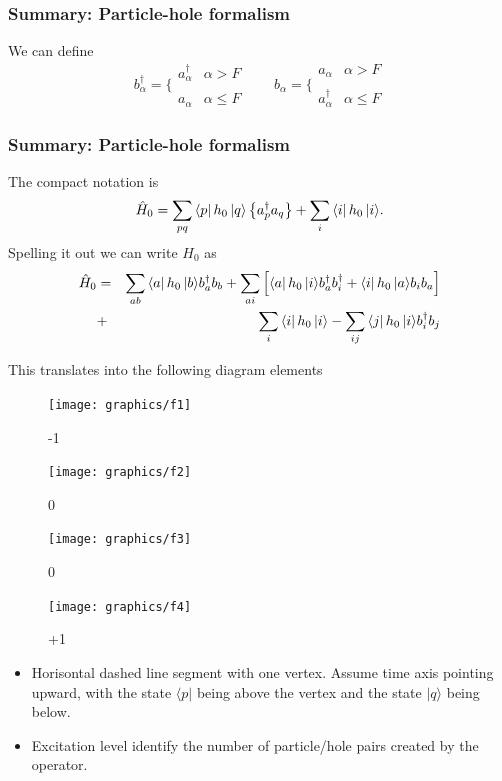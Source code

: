 \frame
{
  \frametitle{Summary: Particle-hole formalism}
\begin{small}
{\scriptsize
We can define
\[
	b_\alpha^\dagger = \Bigg\{ \begin{array}{ll}
		a_\alpha^\dagger & \alpha > F \\
		\\
		a_\alpha & \alpha \leq F
	\end{array} \qquad 
	b_\alpha = \Bigg\{ \begin{array}{ll}
		a_\alpha & \alpha > F \\
		\\
		 a_\alpha^\dagger & \alpha \leq F
	\end{array} 
\]
}
\end{small}
}


\frame
{
  \frametitle{Summary: Particle-hole formalism}
\begin{small}
{\scriptsize
The compact notation is 
\[
        \hat{H}_0 = \sum_{pq} \bra{p}h_0\,|{q}\rangle \left\{a^\dagger_p a_q\right\} +\sum_{i} \bra{i}h_0\,|{i}\rangle.
\]
Spelling it out we can write $H_0$ as 
\begin{eqnarray}
	\hat{H}_0 &=& \sum_{ab} \bra{a}h_0\,|{b}\rangle  b_a^\dagger b_b +
		\sum_{ai} \left[
		\bra{a}h_0\,|{i}\rangle b_a^\dagger b_i^\dagger + 
		\bra{i}h_0\,|{a}\rangle b_i  b_a \right] \nonumber \\
	&+& \sum_{i} \bra{i}h_0\,|{i}\rangle - 
		\sum_{ij} \bra{j}h_0\,|{i}\rangle
		b_i^\dagger b_j \nonumber
\end{eqnarray}
}
\end{small}
}

\begin{frame}{This translates into the following diagram elements}
    \renewcommand{\figurename}{Level}
    \begin{figure}
    \centering
    \parbox{0.20\textwidth}{
            \centering
            \texttt{[image: graphics/f1]}
            \caption{-1}
        }
        \parbox{0.20\textwidth}{
            \centering
            \texttt{[image: graphics/f2]}
            \caption{0}
        }
        \parbox{0.20\textwidth}{
            \centering
            \texttt{[image: graphics/f3]}
            \caption{0}
        }
        \parbox{0.20\textwidth}{
            \centering
            \texttt{[image: graphics/f4]}
            \caption{+1}
        }
    \end{figure}

    \begin{itemize}
        \item Horisontal dashed line segment with one vertex. Assume time axis pointing upward, with 
the state $\langle p|$ being above the vertex and the state $|q\rangle$ being below. 
        \item Excitation level identify the number of particle/hole pairs created by the operator.
    \end{itemize}
\end{frame}



